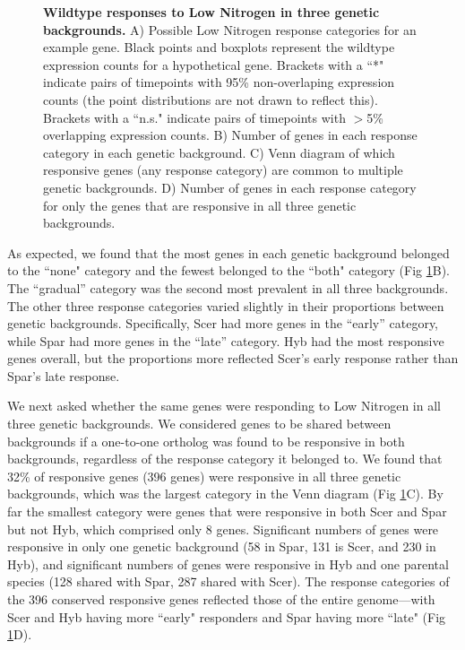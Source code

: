 \begin{figure}
    \centering
    \caption{\textbf{Wildtype responses to Low Nitrogen in three genetic backgrounds.} A) Possible Low Nitrogen response categories for an example gene. Black points and boxplots represent the wildtype expression counts for a hypothetical gene. Brackets with a ``*" indicate pairs of timepoints with 95\% non-overlaping expression counts (the point distributions are not drawn to reflect this). Brackets with a ``n.s." indicate pairs of timepoints with $>$5\% overlapping expression counts. B) Number of genes in each response category in each genetic background. C) Venn diagram of which responsive genes (any response category) are common to multiple genetic backgrounds. D) Number of genes in each response category for only the genes that are responsive in all three genetic backgrounds.}
    \label{fig:wt}
\end{figure}

As expected, we found that the most genes in each genetic background belonged to the ``none" category and the fewest belonged to the ``both" category (Fig \ref{fig:wt}B). The ``gradual'' category was the second most prevalent in all three backgrounds. The other three response categories varied slightly in their proportions between genetic backgrounds. Specifically, Scer had more genes in the ``early'' category, while Spar had more genes in the ``late'' category. Hyb had the most responsive genes overall, but the proportions more reflected Scer's early response rather than Spar's late response.

We next asked whether the same genes were responding to Low Nitrogen in all three genetic backgrounds. We considered genes to be shared between backgrounds if a one-to-one ortholog was found to be responsive in both backgrounds, regardless of the response category it belonged to. We found that 32\% of responsive genes (396 genes) were responsive in all three genetic backgrounds, which was the largest category in the Venn diagram (Fig \ref{fig:wt}C). By far the smallest category were genes that were responsive in both Scer and Spar but not Hyb, which comprised only 8 genes. Significant numbers of genes were responsive in only one genetic background (58 in Spar, 131 is Scer, and 230 in Hyb), and significant numbers of genes were responsive in Hyb and one parental species (128 shared with Spar, 287 shared with Scer). The response categories of the 396 conserved responsive genes reflected those of the entire genome---with Scer and Hyb having more ``early" responders and Spar having more ``late" (Fig \ref{fig:wt}D).

